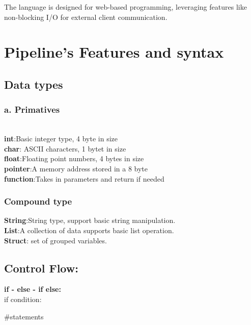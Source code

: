 \documentclass[11pt]{article}
\begin{document}
The language is designed for web-based programming, leveraging features like non-blocking I/O for external client communication. 

\section{Pipeline's Features and syntax}
\subsection*{Data types}

\subsubsection*{a. Primatives}\\

\quad\space\space\textbf{int}:Basic integer type, 4 byte in size \\

\textbf{char}: ASCII characters, 1 bytet in size\\

\textbf{float}:Floating point numbers, 4 bytes in size\\

\textbf{pointer}:A memory address stored in a 8 byte\\

\textbf{function}:Takes in parameters and return if needed
\subsubsection{Compound type}

\quad\space\space\textbf{String}:String type, support basic string manipulation.\\

\textbf{List}:A collection of data supports basic list operation.\\

\textbf{Struct}: set of grouped variables.\\

\subsection{Control Flow:}

\quad\qquad \textbf {if - else - if else: } \\

\qquad\qquad if condition:

\qquad\qquad\qquad \#statements\\
\end{document}
